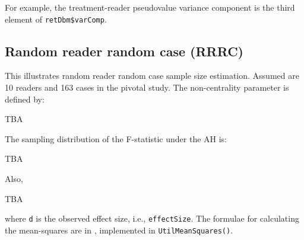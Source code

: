 \documentclass[
]{book}
\newenvironment{Shaded}{\begin{snugshade}}{\end{snugshade}}
\newcommand{\CommentTok}[1]{\textcolor[rgb]{0.56,0.35,0.01}{\textit{#1}}}
\newcommand{\NormalTok}[1]{#1}
\newcommand{\OperatorTok}[1]{\textcolor[rgb]{0.81,0.36,0.00}{\textbf{#1}}}
\begin{document}
\begin{Shaded}
\end{Shaded}

For example, the treatment-reader pseudovalue variance component is the third element of \texttt{retDbm\$varComp}.

\hypertarget{random-reader-random-case-rrrc}{%
\subsection{Random reader random case (RRRC)}\label{random-reader-random-case-rrrc}}

This illustrates random reader random case sample size estimation. Assumed are 10 readers and 163 cases in the pivotal study. The non-centrality parameter is defined by:

TBA

The sampling distribution of the F-statistic under the AH is:

TBA

Also,

TBA

where \texttt{d} is the observed effect size, i.e., \texttt{effectSize}. The formulae for calculating the mean-squares are in \citep{RN1476}, implemented in \texttt{UtilMeanSquares()}.
\end{document}
